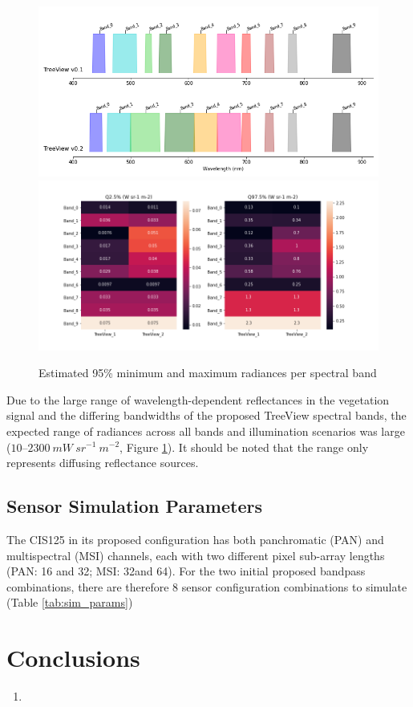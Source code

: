 \documentclass[10pt,a4paper,final,onecolumn]{article}
\begin{document}
\begin{figure}
    \centering
    \includegraphics[width=\textwidth]{TreeView_plots/4_sensor_comparison.png}
    \includegraphics[width=\textwidth]{TreeView_plots/7_minMaxVeg_radiance.png}
    \caption{Estimated 95\% minimum and maximum radiances per spectral band}
    \label{fig:srfs}
\end{figure}
Due to the large range of wavelength-dependent reflectances in the vegetation signal and the differing bandwidths of the proposed TreeView spectral bands, the expected range of radiances across all bands and illumination scenarios was large ($10$--$2300~ mW~sr^{-1}~m^{-2}$, Figure \ref{fig:srfs}). It should be noted that the range only represents diffusing reflectance sources.

\subsection{Sensor Simulation Parameters}
The CIS125 in its proposed configuration has both panchromatic (PAN) and multispectral (MSI) channels, each with two different pixel sub-array lengths (PAN: 16 and 32; MSI: 32and 64). For the two initial proposed bandpass combinations, there are therefore 8 sensor configuration combinations to simulate (Table \ref{tab:sim_params})
\begin{landscape}
\small

\end{landscape}

\section{Conclusions}
\begin{enumerate}
\item
\end{enumerate}


\end{document}
